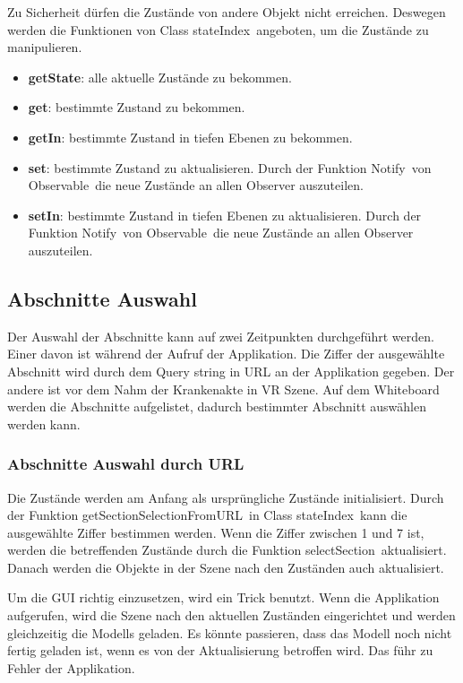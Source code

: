   Zu Sicherheit dürfen die Zustände von andere Objekt nicht erreichen. Deswegen werden die Funktionen von Class \glqq stateIndex\grqq\ angeboten, um die Zustände zu manipulieren.
  
  \begin{itemize}
      \item \textbf{getState}: alle aktuelle Zustände zu bekommen.
      \item \textbf{get}: bestimmte Zustand zu bekommen.
      \item \textbf{getIn}: bestimmte Zustand in tiefen Ebenen zu bekommen.
      \item \textbf{set}: bestimmte Zustand zu aktualisieren. Durch der Funktion \glqq Notify\grqq\ von \glqq Observable\grqq\ die neue Zustände an allen Observer auszuteilen.
      \item \textbf{setIn}: bestimmte Zustand in tiefen Ebenen zu aktualisieren. Durch der Funktion \glqq Notify\grqq\ von \glqq Observable\grqq\ die neue Zustände an allen Observer auszuteilen.
  \end{itemize}
  
 \subsection{Abschnitte Auswahl}
 Der Auswahl der Abschnitte kann auf zwei Zeitpunkten durchgeführt werden. Einer davon ist während der Aufruf der Applikation. Die Ziffer der ausgewählte Abschnitt wird durch dem Query string in URL an der Applikation gegeben. Der andere ist vor dem Nahm der Krankenakte in VR Szene. Auf dem Whiteboard werden die Abschnitte aufgelistet, dadurch bestimmter Abschnitt auswählen werden kann.
 
  \subsubsection{Abschnitte Auswahl durch URL}
  Die Zustände werden am Anfang als ursprüngliche Zustände initialisiert. Durch der Funktion \glqq getSectionSelectionFromURL\grqq\ in Class \glqq stateIndex\grqq\ kann die ausgewählte Ziffer bestimmen werden. Wenn die Ziffer zwischen 1 und 7 ist, werden die betreffenden Zustände durch die Funktion \glqq selectSection\grqq\ aktualisiert. Danach werden die Objekte in der Szene nach den Zuständen auch aktualisiert.
  
  Um die GUI richtig einzusetzen, wird ein Trick benutzt. Wenn die Applikation aufgerufen, wird die Szene nach den aktuellen Zuständen eingerichtet und werden gleichzeitig die Modells geladen. Es könnte passieren, dass das Modell noch nicht fertig geladen ist, wenn es von der Aktualisierung betroffen wird. Das führ zu Fehler der Applikation.
  
